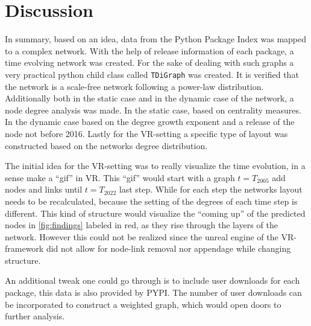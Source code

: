 \documentclass[a4paper]{article}
\begin{document}
\section{Discussion}
In summary, based on an idea, data from the Python Package Index \cite{pypi}
was mapped to a complex network. With the help of release information of each
package, a time evolving network was created. For the sake of dealing with
such graphs a very practical python child class called \texttt{TDiGraph} was
created. It is verified that the network is a scale-free network following a
power-law distribution. Additionally both in the static case and in the
dynamic case of the network, a node degree analysis was made. In the static
case, based on centrality measures. In the dynamic case based on the degree
growth exponent and a release of the node not before 2016. Lastly for the
VR-setting a specific type of layout was constructed based on the networks
degree distribution.

The initial idea for the VR-setting was to really visualize the time
evolution, in a sense  make a ``gif'' in VR. This ``gif'' would start with
a graph $t=T_{2005}$ add nodes and links until $t=T_{2022}$ last step. While
for each step the networks layout needs to be recalculated, because the
setting of the degrees of each time step is different. This kind of structure
would visualize the ``coming up'' of the predicted nodes in \ref{fig:findings}
labeled in red, as they rise through the layers of the network. However this
could not be realized since the unreal engine of the VR-framework did not
allow for node-link removal nor appendage while changing structure.

An additional tweak one could go through is to include user downloads for
each package, this data is also provided by PYPI. The number of user
downloads can be incorporated to construct a weighted graph, which would open
doors to further analysis.

\nocite{barabasi}
\printbibliography
\end{document}
